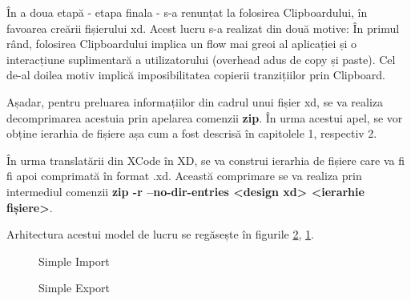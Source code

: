 În a doua etapă - etapa finala - s-a renunțat la folosirea Clipboardului, în favoarea creării fișierului xd. 
Acest lucru s-a realizat din două motive: În primul rând, folosirea Clipboardului implica un flow mai greoi al aplicației și o interacțiune suplimentară a utilizatorului (overhead adus de copy și paste). Cel de-al doilea motiv implică imposibilitatea copierii tranzițiilor prin Clipboard.

Așadar, pentru preluarea informațiilor din cadrul unui fișier xd, se va realiza decomprimarea acestuia prin apelarea comenzii \textbf{zip}. În urma acestui apel, se vor obține ierarhia de fișiere așa cum a fost descrisă în capitolele 1, respectiv 2.

În urma translatării din XCode în XD, se va construi ierarhia de fișiere care va fi fi apoi comprimată în format .xd. Această comprimare se va realiza prin intermediul comenzii \textbf{zip -r --no-dir-entries <design xd> <ierarhie fișiere>}. 

Arhitectura acestui model de lucru se regăsește în figurile \ref{fig:Export}, \ref{fig:Import}.

\begin{figure}[!htbp]
\centering
{}
\caption{Simple Import} \label{fig:Import}
\end{figure}

\begin{figure}[!htbp]
\centering
{}
\caption{Simple Export} \label{fig:Export}
\end{figure}


